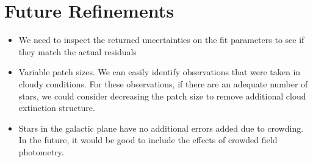 \documentclass[12pt,preprint]{aastex}
\begin{document}
\section{Future Refinements}
\begin{itemize}
\item{We need to inspect the returned uncertainties on the fit parameters to see if they match the actual residuals}
\item{Variable patch sizes.  We can easily identify observations that were taken in cloudy conditions.  For these observations, if there are an adequate number of stars, we could consider decreasing the patch size to remove additional cloud extinction structure.}
\item{Stars in the galactic plane have no additional errors added due to crowding.  In the future, it would be good to include the effects of crowded field photometry.  }
\end{itemize}



\end{document}
